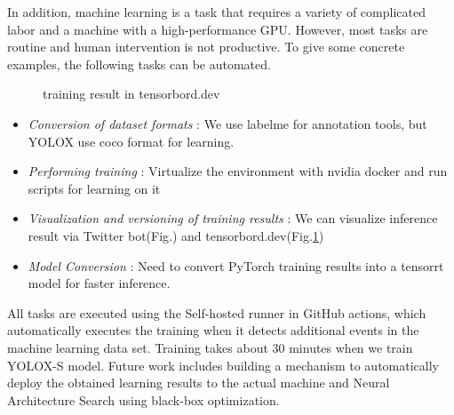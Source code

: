 \documentclass[lettersize,journal]{IEEEtran}
\begin{document}
In addition, machine learning is a task that requires a variety of complicated labor and a machine with a high-performance GPU.
However, most tasks are routine and human intervention is not productive.
To give some concrete examples, the following tasks can be automated.

\begin{figure}[H]
    \begin{center}
  \end{center}
  \caption{training result in tensorbord.dev}
  \label{fig:tensorbord}
\end{figure}

\begin{itemize}
    \item {\it Conversion of dataset formats }:
        We use labelme for annotation tools, but YOLOX use coco format for learning.
    \item {\it Performing training }:
        Virtualize the environment with nvidia docker and run scripts for learning on it
    \item {\it Visualization and versioning of training results }:
        We can visualize inference result via Twitter bot(Fig.\cite{wam_v_tan_bot}) and tensorbord.dev(Fig.\ref{fig:tensorbord})
    \item {\it Model Conversion }:
        Need to convert PyTorch training results into a tensorrt model for faster inference.
\end{itemize}

All tasks are executed using the Self-hosted runner in GitHub actions, 
which automatically executes the training when it detects additional events in the machine learning data set.
Training takes about 30 minutes when we train YOLOX-S model.
Future work includes building a mechanism to automatically deploy the obtained learning results to 
the actual machine and Neural Architecture Search using black-box optimization.
\end{document}
